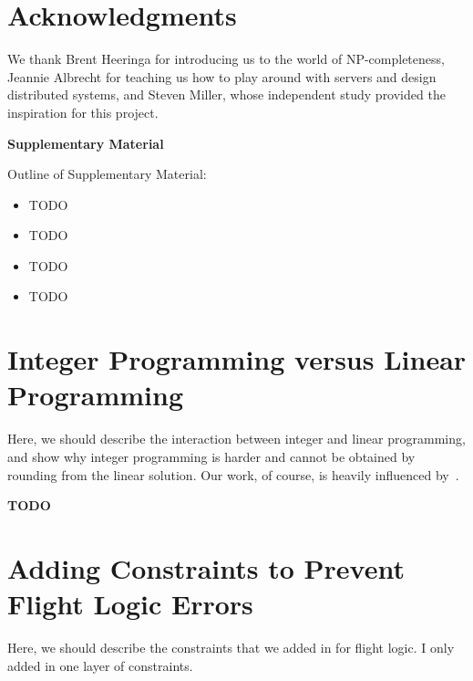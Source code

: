 \documentclass{article}
\begin{document}
\section*{Acknowledgments}
 
We thank Brent Heeringa for introducing us to the world of NP-completeness, Jeannie Albrecht for teaching us how to play around with servers and
design distributed systems, and Steven Miller, whose independent study provided the inspiration for this project.











\onecolumn

\appendix

\begin{center}
{\Large \textbf{Supplementary Material}}
\end{center}

Outline of Supplementary Material:

\begin{itemize}[noitemsep]
    \item TODO
    \item TODO
    \item TODO
    \item TODO
\end{itemize}


\section{Integer Programming versus Linear Programming}\label{app:lin_vs_int}

Here, we should describe the interaction between integer and linear programming, and show why integer programming is harder and cannot be obtained by
rounding from the linear solution. Our work, of course, is heavily influenced by~\cite{stevenmiller}.

{\bf TODO}

\section{Adding Constraints to Prevent Flight Logic Errors}\label{app:flight_logic}

Here, we should describe the constraints that we added in for flight logic. I only added in one layer of constraints.
\end{document}
